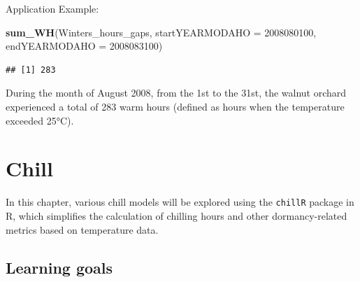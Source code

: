 \documentclass[
]{article}
\newenvironment{Shaded}{\begin{snugshade}}{\end{snugshade}}
\newcommand{\AttributeTok}[1]{\textcolor[rgb]{0.13,0.29,0.53}{#1}}
\newcommand{\DecValTok}[1]{\textcolor[rgb]{0.00,0.00,0.81}{#1}}
\newcommand{\FunctionTok}[1]{\textcolor[rgb]{0.13,0.29,0.53}{\textbf{#1}}}
\newcommand{\NormalTok}[1]{#1}
\newcommand{\OtherTok}[1]{\textcolor[rgb]{0.56,0.35,0.01}{#1}}
\newcommand{\SpecialCharTok}[1]{\textcolor[rgb]{0.81,0.36,0.00}{\textbf{#1}}}
\begin{document}
\begin{Shaded}
\end{Shaded}

Application Example:

\begin{Shaded}
\begin{Highlighting}[]
\FunctionTok{sum\_WH}\NormalTok{(Winters\_hours\_gaps, }\AttributeTok{startYEARMODAHO =} \DecValTok{2008080100}\NormalTok{, }
                           \AttributeTok{endYEARMODAHO =} \DecValTok{2008083100}\NormalTok{)}
\end{Highlighting}
\end{Shaded}

\begin{verbatim}
## [1] 283
\end{verbatim}

During the month of August 2008, from the 1st to the 31st, the walnut orchard experienced a total of 283 warm hours (defined as hours when the temperature exceeded 25°C).

\section{Chill}\label{chill}

In this chapter, various chill models will be explored using the \texttt{chillR} package in R, which simplifies the calculation of chilling hours and other dormancy-related metrics based on temperature data.

\subsection{Learning goals}\label{learning-goals-4}
\end{document}
